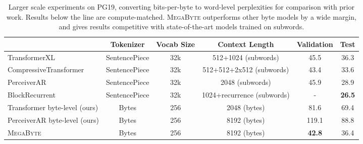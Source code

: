 \documentclass{article}
\newcommand{\fastslow}[0]{\textsc{MegaByte}\xspace}
\newcommand{\megabyte}[0]{\fastslow}
\newcommand{\wip}[1]{\textcolor{purple}{#1}}
\theoremstyle{plain}
\theoremstyle{definition}
\theoremstyle{remark}
\begin{document}
\begin{table}[t]
\centering
\small
\begin{tabular}{lccccc}
\toprule
{} & Tokenizer & Vocab Size & Context Length & Validation & Test \\
\midrule
TransformerXL          \cite{compressive}       & SentencePiece & 32k & 512+1024 (subwords) & 45.5 & 36.3 \\
CompressiveTransformer \cite{compressive}       & SentencePiece & 32k & 512+512+2x512 (subwords) & 43.4 & 33.6 \\
PerceiverAR \cite{perceiverar}   & SentencePiece & 32k & 2048 (subwords) & 45.9 & 28.9 \\
BlockRecurrent \cite{blockrecurrent}            & SentencePiece & 32k & 1024+recurrence (subwords) & -   & \bf{26.5} \\
\midrule 
Transformer byte-level (ours)                   & Bytes         & 256 & 2048 (bytes) & 81.6 & 69.4  \\
PerceiverAR byte-level (ours)                   & Bytes         & 256 & 8192 (bytes) & 119.1 & 88.8 \\
\megabyte                                       & Bytes         & 256 & 8192 (bytes)  & \bf{42.8} & 36.4 \\
\bottomrule
\end{tabular}
\caption{\label{tab:text_sota}Larger scale experiments on PG19, converting bits-per-byte to word-level perplexities for comparison with prior work. Results below the line are compute-matched.  \megabyte outperforms other byte models by a wide margin, and gives results competitive with state-of-the-art models trained on subwords.}
\label{tab:pg19_summary}
\end{table}
\label{sec:results}
\end{document}
